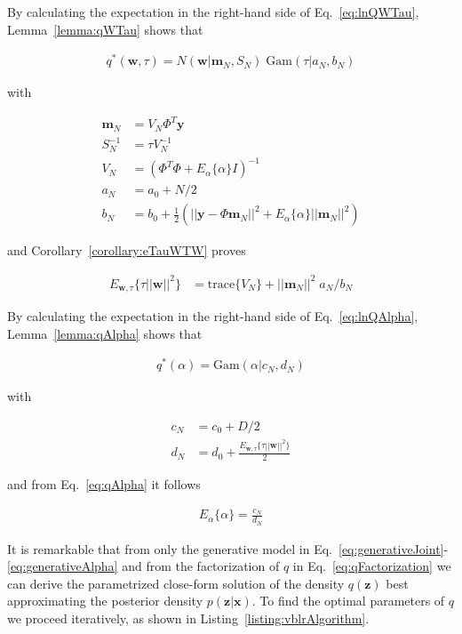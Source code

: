 \documentclass[12pt]{article}
\begin{document}
By calculating the expectation in the right-hand side of Eq.~\ref{eq:lnQWTau},
Lemma~\ref{lemma:qWTau} shows that

\begin{align}
q^*(\mathbf{w},\tau)=N(\mathbf{w}|\mathbf{m}_N,S_N)\;\text{Gam}(\tau|a_N,b_N)\label{eq:qWTau}
\end{align}

\noindent with 

\begin{align}
\mathbf{m}_N&=V_N\Phi^T\mathbf{y}\label{eq:m_N}\\
S_N^{-1}&=\tau V_N^{-1}\label{eq:S_N}\\
V_N&=(\Phi^T\Phi+E_\alpha\{\alpha\}I)^{-1}\nonumber\\
a_N&=a_0+N/2\label{eq:a_N}\\
b_N&=b_0+\frac{1}{2}(||\mathbf{y}-\Phi\mathbf{m}_N||^2+E_\alpha\{\alpha\}||\mathbf{m}_N||^2)\label{eq:b_N}
\end{align}

\noindent and Corollary~\ref{corollary:eTauWTW} proves

\begin{align}
E_{\mathbf{w},\tau}\{\tau||\mathbf{w}||^2\}&=\text{trace}\{V_N\}+||\mathbf{m}_N||^2\;a_N/b_N\label{eq:eTauW2}
\end{align}

By calculating the expectation in the right-hand side of Eq.~\ref{eq:lnQAlpha},
Lemma~\ref{lemma:qAlpha} shows that

\begin{align}
q^*(\alpha)=\text{Gam}(\alpha|c_N,d_N)\label{eq:qAlpha}
\end{align}

\noindent with 

\begin{align}
c_N&=c_0+D/2\label{eq:c_N}\\
d_N&=d_0+\frac{E_{\mathbf{w},\tau}\{\tau||\mathbf{w}||^2\}}{2\label{eq:d_N}}
\end{align}

\noindent and from Eq.~\ref{eq:qAlpha} it follows

\begin{align}
E_\alpha\{\alpha\}=\frac{c_N}{d_N}\nonumber
\end{align}

It is remarkable that from only the generative model in
Eq.~\ref{eq:generativeJoint}-\ref{eq:generativeAlpha} and from the
factorization of $q$ in Eq.~\ref{eq:qFactorization} we can derive the
parametrized close-form solution of the density $q(\mathbf{z})$ best
approximating the posterior density $p(\mathbf{z}|\mathbf{x})$. To find the
optimal parameters of $q$ we proceed iteratively, as shown in
Listing~\ref{listing:vblrAlgorithm}.
\end{document}
